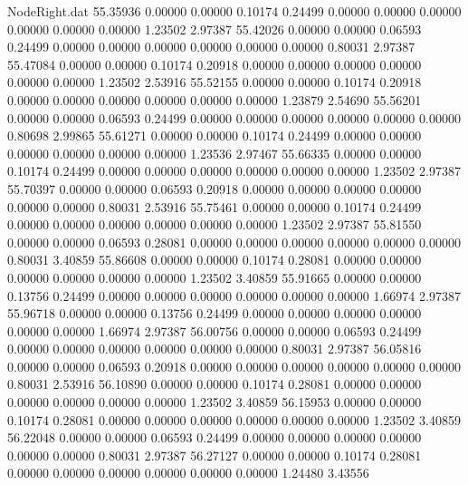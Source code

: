\begin{filecontents}{NodeRight.dat}
  55.35936    0.00000    0.00000     0.10174    0.24499    0.00000    0.00000    0.00000    0.00000    0.00000    0.00000    1.23502    2.97387
  55.42026    0.00000    0.00000     0.06593    0.24499    0.00000    0.00000    0.00000    0.00000    0.00000    0.00000    0.80031    2.97387
  55.47084    0.00000    0.00000     0.10174    0.20918    0.00000    0.00000    0.00000    0.00000    0.00000    0.00000    1.23502    2.53916
  55.52155    0.00000    0.00000     0.10174    0.20918    0.00000    0.00000    0.00000    0.00000    0.00000    0.00000    1.23879    2.54690
  55.56201    0.00000    0.00000     0.06593    0.24499    0.00000    0.00000    0.00000    0.00000    0.00000    0.00000    0.80698    2.99865
  55.61271    0.00000    0.00000     0.10174    0.24499    0.00000    0.00000    0.00000    0.00000    0.00000    0.00000    1.23536    2.97467
  55.66335    0.00000    0.00000     0.10174    0.24499    0.00000    0.00000    0.00000    0.00000    0.00000    0.00000    1.23502    2.97387
  55.70397    0.00000    0.00000     0.06593    0.20918    0.00000    0.00000    0.00000    0.00000    0.00000    0.00000    0.80031    2.53916
  55.75461    0.00000    0.00000     0.10174    0.24499    0.00000    0.00000    0.00000    0.00000    0.00000    0.00000    1.23502    2.97387
  55.81550    0.00000    0.00000     0.06593    0.28081    0.00000    0.00000    0.00000    0.00000    0.00000    0.00000    0.80031    3.40859
  55.86608    0.00000    0.00000     0.10174    0.28081    0.00000    0.00000    0.00000    0.00000    0.00000    0.00000    1.23502    3.40859
  55.91665    0.00000    0.00000     0.13756    0.24499    0.00000    0.00000    0.00000    0.00000    0.00000    0.00000    1.66974    2.97387
  55.96718    0.00000    0.00000     0.13756    0.24499    0.00000    0.00000    0.00000    0.00000    0.00000    0.00000    1.66974    2.97387
  56.00756    0.00000    0.00000     0.06593    0.24499    0.00000    0.00000    0.00000    0.00000    0.00000    0.00000    0.80031    2.97387
  56.05816    0.00000    0.00000     0.06593    0.20918    0.00000    0.00000    0.00000    0.00000    0.00000    0.00000    0.80031    2.53916
  56.10890    0.00000    0.00000     0.10174    0.28081    0.00000    0.00000    0.00000    0.00000    0.00000    0.00000    1.23502    3.40859
  56.15953    0.00000    0.00000     0.10174    0.28081    0.00000    0.00000    0.00000    0.00000    0.00000    0.00000    1.23502    3.40859
  56.22048    0.00000    0.00000     0.06593    0.24499    0.00000    0.00000    0.00000    0.00000    0.00000    0.00000    0.80031    2.97387
  56.27127    0.00000    0.00000     0.10174    0.28081    0.00000    0.00000    0.00000    0.00000    0.00000    0.00000    1.24480    3.43556

\end{filecontents}
